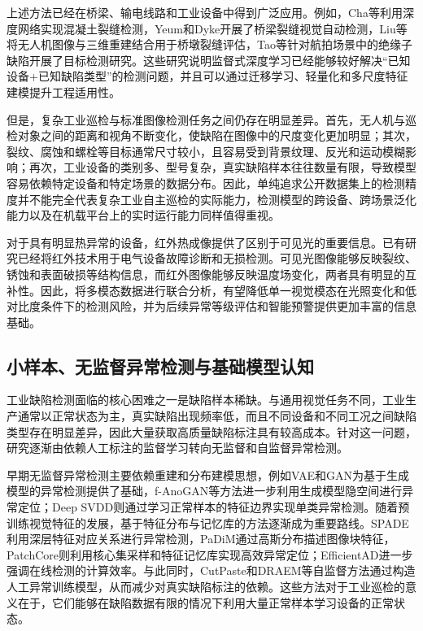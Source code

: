 上述方法已经在桥梁、输电线路和工业设备中得到广泛应用。例如，Cha等利用深度网络实现混凝土裂缝检测\cite{cha2017deep}，Yeum和Dyke开展了桥梁裂缝视觉自动检测\cite{yeum2015vision}，Liu等将无人机图像与三维重建结合用于桥墩裂缝评估\cite{liu2020image}，Tao等针对航拍场景中的绝缘子缺陷开展了目标检测研究\cite{tao2020detection}。这些研究说明监督式深度学习已经能够较好解决“已知设备+已知缺陷类型”的检测问题，并且可以通过迁移学习、轻量化和多尺度特征建模提升工程适用性。

但是，复杂工业巡检与标准图像检测任务之间仍存在明显差异。首先，无人机与巡检对象之间的距离和视角不断变化，使缺陷在图像中的尺度变化更加明显；其次，裂纹、腐蚀和螺栓等目标通常尺寸较小，且容易受到背景纹理、反光和运动模糊影响；再次，工业设备的类别多、型号复杂，真实缺陷样本往往数量有限，导致模型容易依赖特定设备和特定场景的数据分布\cite{taox2021survey,zhouwq2024review}。因此，单纯追求公开数据集上的检测精度并不能完全代表复杂工业自主巡检的实际能力，检测模型的跨设备、跨场景泛化能力以及在机载平台上的实时运行能力同样值得重视。

对于具有明显热异常的设备，红外热成像提供了区别于可见光的重要信息。已有研究已经将红外技术用于电气设备故障诊断和无损检测\cite{jadin2012recent,usamentiaga2014infrared}。可见光图像能够反映裂纹、锈蚀和表面破损等结构信息，而红外图像能够反映温度场变化，两者具有明显的互补性。因此，将多模态数据进行联合分析，有望降低单一视觉模态在光照变化和低对比度条件下的检测风险，并为后续异常等级评估和智能预警提供更加丰富的信息基础。

\subsection{小样本、无监督异常检测与基础模型认知}

工业缺陷检测面临的核心困难之一是缺陷样本稀缺。与通用视觉任务不同，工业生产通常以正常状态为主，真实缺陷出现频率低，而且不同设备和不同工况之间缺陷类型存在明显差异，因此大量获取高质量缺陷标注具有较高成本。针对这一问题，研究逐渐由依赖人工标注的监督学习转向无监督和自监督异常检测\cite{taox2021survey,pang2021deep}。

早期无监督异常检测主要依赖重建和分布建模思想，例如VAE和GAN为基于生成模型的异常检测提供了基础\cite{kingma2014auto,goodfellow2014generative}，f-AnoGAN等方法进一步利用生成模型隐空间进行异常定位；Deep SVDD则通过学习正常样本的特征边界实现单类异常检测\cite{ruff2018deep,fangan2019}。随着预训练视觉特征的发展，基于特征分布与记忆库的方法逐渐成为重要路线。SPADE利用深层特征对应关系进行异常检测，PaDiM通过高斯分布描述图像块特征，PatchCore\cite{roth2022towards}则利用核心集采样和特征记忆库实现高效异常定位；EfficientAD\cite{batzner2024efficientad}进一步强调在线检测的计算效率。与此同时，CutPaste和DRAEM等自监督方法通过构造人工异常训练模型，从而减少对真实缺陷标注的依赖\cite{zavrtanik2021draem}。这些方法对于工业巡检的意义在于，它们能够在缺陷数据有限的情况下利用大量正常样本学习设备的正常状态。

